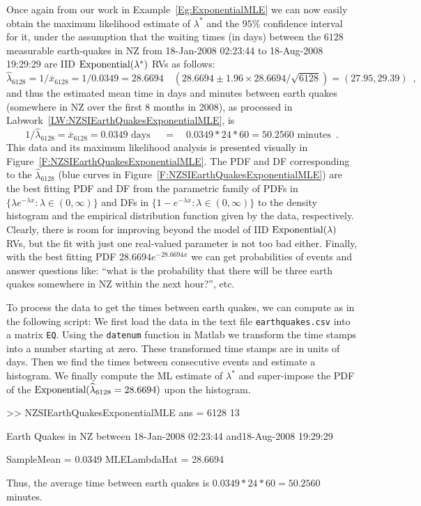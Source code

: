 \begin{example}\label{LW:NZSIEarthQuakesExponentialMLE}  
Once again from our work in Example~\ref{Eg:ExponentialMLE} we can now easily obtain the maximum likelihood estimate of $\lambda^*$ and the $95\%$ confidence interval for it, under the assumption that the waiting times (in days) between the $6128$ measurable earth-quakes in NZ from 18-Jan-2008 02:23:44 to 18-Aug-2008 19:29:29 are IID $\mbox{{\rm Exponential}}(\lambda^*)$ RVs as follows: 
$$\widehat{\lambda}_{6128}=1/\overline{x}_{6128}=1/0.0349=28.6694 \quad 
(28.6694 \pm 1.96 \times 28.6694/\sqrt{6128}) = (27.95,29.39) \enspace ,$$ 
and thus the estimated mean time in days and minutes between earth quakes (somewhere in NZ over the first 8 months in 2008), as processed in Labwork~\ref{LW:NZSIEarthQuakesExponentialMLE}, is 
$$1/\widehat{\lambda}_{6128}=\overline{x}_{6128}=0.0349 \text{ days } \quad = \quad 0.0349*24*60=50.2560  \text{ minutes} \enspace .$$  
This data and its maximum likelihood analysis is presented visually in Figure~\ref{F:NZSIEarthQuakesExponentialMLE}.  The PDF and DF corresponding to the $\widehat{\lambda}_{6128}$ (blue curves in Figure~\ref{F:NZSIEarthQuakesExponentialMLE}) are the best fitting PDF and DF from the parametric family of PDFs in $\{\lambda e^{-\lambda x}: \lambda \in (0,\infty) \}$ and DFs in $\{1- e^{-\lambda x}: \lambda \in (0,\infty) \}$ to the density histogram and the empirical distribution function given by the data, respectively.  Clearly, there is room for improving beyond the model of IID $\mbox{{\rm Exponential}}(\lambda)$ RVs, but the fit with just one real-valued parameter is not too bad either.  Finally, with the best fitting PDF $28.6694 e^{-28.6694 x}$ we can get probabilities of events and answer questions like: ``what is the probability that there will be three earth quakes somewhere in NZ within the next hour?'', etc.
\end{example}

\begin{labwork}\label{LW:NZSIEarthQuakesExponentialMLE}
To process the data to get the times between earth quakes, we can compute as in the following script:
We first load the data in the text file {\tt earthquakes.csv} into a matrix {\tt EQ}.  Using the {\tt datenum} function in {\sc Matlab} we transform the time stamps into a number starting at zero.  These transformed time stamps are in units of days.  Then we find the times between consecutive events and estimate a histogram.  We finally compute the ML estimate of $\lambda^*$ and super-impose the PDF of the $\mbox{{\rm Exponential}}(\widehat{\lambda}_{6128}= 28.6694)$ upon the histogram.
\begin{VrbM}
>> NZSIEarthQuakesExponentialMLE
ans =        6128          13

Earth Quakes in NZ between
18-Jan-2008 02:23:44 and18-Aug-2008 19:29:29

SampleMean =    0.0349
MLELambdaHat =   28.6694
\end{VrbM}
Thus, the average time between earth quakes is $0.0349*24*60=50.2560$ minutes.
\end{labwork}

